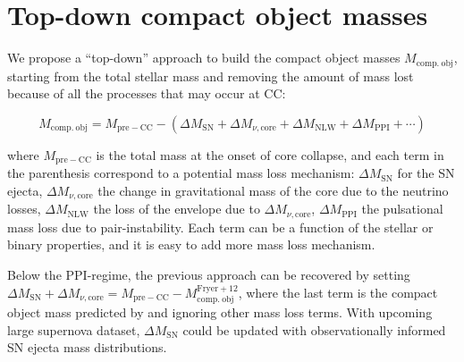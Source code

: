 \documentclass[twocolumn]{aastex63}
\newcommand{\todo}[1]{{\large $\blacksquare$~\textbf{\color{red}[#1]}}~$\blacksquare$}
\begin{document}
\section{Top-down compact object masses}

We propose a ``top-down'' approach to build the compact object masses
$M_\mathrm{comp.\ obj}$, starting from the total stellar mass and
removing the amount of mass lost because of all the processes that may
occur at CC:


\begin{widetext}
  \begin{equation}
    \label{eq:mass}
    M_\mathrm{comp.\ obj} = M_\mathrm{pre-CC} - \left(\Delta M_\mathrm{SN} + \Delta M_{\nu, \mathrm{core}} + \Delta M_\mathrm{NLW} + \Delta M_\mathrm{PPI} + \cdots \right)
  \end{equation}
\end{widetext}

where $M_\mathrm{pre-CC}$ is the total mass at the onset of core
collapse, and each term in the parenthesis correspond to a potential
mass loss mechanism: $\Delta M_\mathrm{SN}$ for the SN ejecta,
$\Delta M_{\nu, \mathrm{core}}$ the change in gravitational mass of
the core due to the neutrino losses, $\Delta M_\mathrm{NLW}$ the
\cite{nadhezin:80, lovegrove:13} loss of the envelope due to
$\Delta M_{\nu, \mathrm{core}}$, $\Delta M_\mathrm{PPI}$ the
pulsational mass loss due to pair-instability. Each term can be a
function of the stellar or binary properties, and it is easy to add
more mass loss mechanism.

Below the PPI-regime, the previous approach can be recovered by
setting
$\Delta M_\mathrm{SN} + \Delta M_{\nu, \mathrm{core}} = M_\mathrm{pre-CC} - M_\mathrm{comp.\ obj}^\mathrm{Fryer+12}$,
where the last term is the compact object mass predicted by
\cite{fryer:12} and ignoring other mass loss terms. With upcoming
large supernova dataset, $\Delta M_\mathrm{SN}$ could be updated with
observationally informed SN ejecta mass distributions.
\end{document}
